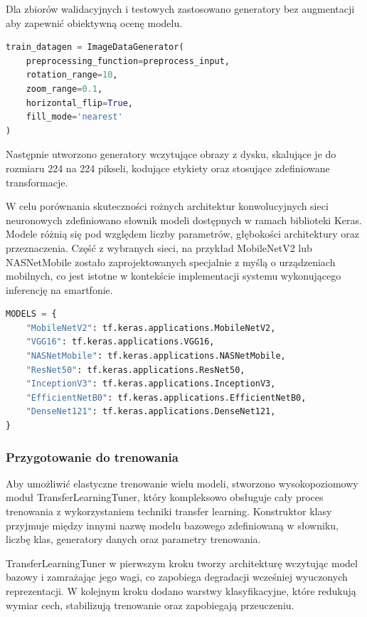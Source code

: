 Dla zbiorów walidacyjnych i testowych zastosowano generatory bez augmentacji aby zapewnić obiektywną ocenę modelu.

\begin{lstlisting}[language=Python, caption=Definicja ImageDataGeneratora dla klasy treningowej]
train_datagen = ImageDataGenerator(
	preprocessing_function=preprocess_input,
	rotation_range=10,
	zoom_range=0.1,
	horizontal_flip=True,
	fill_mode='nearest'
)
\end{lstlisting}

Następnie utworzono generatory wczytujące obrazy z dysku, skalujące je do rozmiaru 224 na 224 pikseli, kodujące etykiety oraz stosujące zdefiniowane transformacje.

W celu porównania skuteczności rożnych architektur konwolucyjnych sieci neuronowych zdefiniowano słownik modeli dostępnych w ramach biblioteki Keras.
Modele różnią się pod względem liczby parametrów, głębokości architektury oraz przeznaczenia.
Część z wybranych sieci, na przykład MobileNetV2 lub NASNetMobile zostało zaprojektowanych specjalnie z myślą o urządzeniach mobilnych, co jest istotne w kontekście implementacji systemu wykonującego inferencję na smartfonie.

\begin{lstlisting}[language=Python, caption=Słownik sieci neuronowych]
MODELS = {
	"MobileNetV2": tf.keras.applications.MobileNetV2,
	"VGG16": tf.keras.applications.VGG16,
	"NASNetMobile": tf.keras.applications.NASNetMobile,
	"ResNet50": tf.keras.applications.ResNet50,
	"InceptionV3": tf.keras.applications.InceptionV3,
	"EfficientNetB0": tf.keras.applications.EfficientNetB0,
	"DenseNet121": tf.keras.applications.DenseNet121,
}
\end{lstlisting}

\subsubsection{Przygotowanie do trenowania}
Aby umożliwić elastyczne trenowanie wielu modeli, stworzono wysokopoziomowy moduł TransferLearningTuner, który kompleksowo obsługuje cały proces trenowania z wykorzystaniem techniki transfer learning.
Konstruktor klasy przyjmuje między innymi nazwę modelu bazowego zdefiniowaną w słowniku, liczbę klas, generatory danych oraz parametry trenowania.

TransferLearningTuner w pierwszym kroku tworzy architekturę wczytując model bazowy i zamrażając jego wagi, co zapobiega degradacji wcześniej wyuczonych reprezentacji.
W kolejnym kroku dodano warstwy klasyfikacyjne, które redukują wymiar cech, stabilizują trenowanie oraz zapobiegają przeuczeniu.

